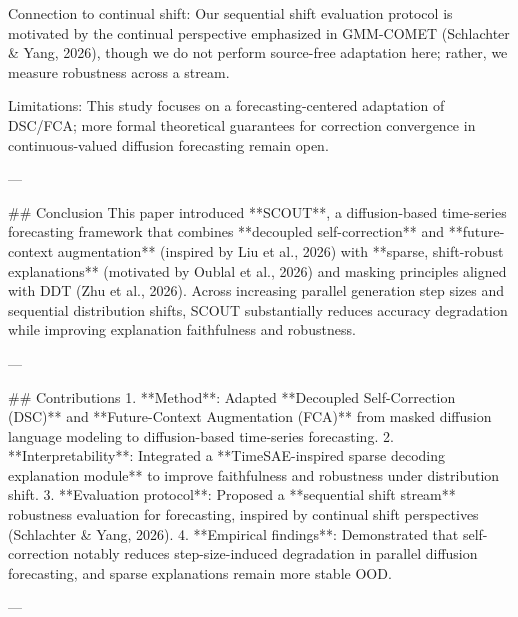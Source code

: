 Connection to continual shift: Our sequential shift evaluation protocol is motivated by the continual perspective emphasized in GMM-COMET (Schlachter & Yang, 2026), though we do not perform source-free adaptation here; rather, we measure robustness across a stream.

Limitations: This study focuses on a forecasting-centered adaptation of DSC/FCA; more formal theoretical guarantees for correction convergence in continuous-valued diffusion forecasting remain open.

---

## Conclusion  
This paper introduced **SCOUT**, a diffusion-based time-series forecasting framework that combines **decoupled self-correction** and **future-context augmentation** (inspired by Liu et al., 2026) with **sparse, shift-robust explanations** (motivated by Oublal et al., 2026) and masking principles aligned with DDT (Zhu et al., 2026). Across increasing parallel generation step sizes and sequential distribution shifts, SCOUT substantially reduces accuracy degradation while improving explanation faithfulness and robustness.

---

## Contributions  
1. **Method**: Adapted **Decoupled Self-Correction (DSC)** and **Future-Context Augmentation (FCA)** from masked diffusion language modeling to diffusion-based time-series forecasting.  
2. **Interpretability**: Integrated a **TimeSAE-inspired sparse decoding explanation module** to improve faithfulness and robustness under distribution shift.  
3. **Evaluation protocol**: Proposed a **sequential shift stream** robustness evaluation for forecasting, inspired by continual shift perspectives (Schlachter & Yang, 2026).  
4. **Empirical findings**: Demonstrated that self-correction notably reduces step-size-induced degradation in parallel diffusion forecasting, and sparse explanations remain more stable OOD.

---